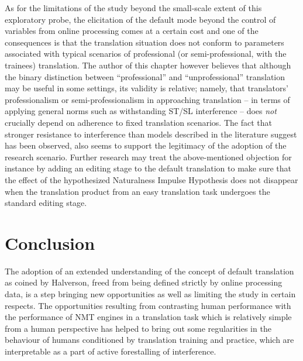 \documentclass[output=paper]{langscibook}
\begin{document}
As for the limitations of the study beyond the small-scale extent of this exploratory probe, the elicitation of the default mode beyond the control of variables from online processing comes at a certain cost and one of the consequences is that the translation situation does not conform to parameters associated with typical scenarios of professional (or semi-professional, with the trainees) translation. The author of this chapter however believes that although the binary distinction between “professional” and “unprofessional” translation may be useful in some settings, its validity is relative; namely, that translators’ professionalism or semi-professionalism in approaching translation – in terms of applying general norms such as withstanding ST/SL interference – does \textit{not} crucially depend on adherence to fixed translation scenarios. The fact that stronger resistance to interference than models described in the literature suggest has been observed, also seems to support the legitimacy of the adoption of the research scenario. Further research may treat the above-mentioned objection for instance by adding an editing stage to the default translation to make sure that the effect of the hypothesized Naturalness Impulse Hypothesis does not disappear when the translation product from an easy translation task undergoes the standard editing stage.

\section{Conclusion}

The adoption of an extended understanding of the concept of default translation as coined by Halverson, freed from being defined strictly by online processing data, is a step bringing new opportunities as well as limiting the study in certain respects. The opportunities resulting from contrasting human performance with the performance of NMT engines in a translation task which is relatively simple from a human perspective has helped to bring out some regularities in the behaviour of humans conditioned by translation training and practice, which are interpretable as a part of active forestalling of interference.
\end{document}
